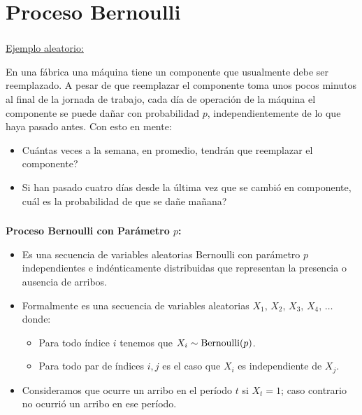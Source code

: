 \documentclass[ 10pt, xcolor = dvipsnames]{beamer}
\begin{document}
\section{Proceso Bernoulli}

\begin{frame}[allowframebreaks]
\frametitle{\insertsection}

\underline{Ejemplo aleatorio:}

En una f\'abrica una m\'aquina tiene un componente que usualmente debe ser reemplazado. A pesar de que reemplazar el componente toma unos pocos minutos al final de la jornada de trabajo, cada d\'ia de operaci\'on de la m\'aquina el componente se puede da\~nar con probabilidad $p$, independientemente de lo que haya pasado antes. Con esto en mente: 
\begin{itemize}
\item Cu\'antas veces a la semana, en promedio, tendr\'an que reemplazar el componente? 
\item Si han pasado cuatro d\'ias desde la \'ultima vez que se cambi\'o en componente, cu\'al es la probabilidad de que se da\~ne ma\~nana? 
\end{itemize}

\end{frame}

\begin{frame}[allowframebreaks]
\frametitle{\insertsection}

\textbf{Proceso Bernoulli con Par\'ametro $p$:}
\begin{itemize}
\item Es una secuencia de variables aleatorias Bernoulli con par\'ametro $p$ independientes e ind\'enticamente distribuidas que representan la \linebreak presencia o ausencia de arribos. 
\item Formalmente es una secuencia de variables aleatorias $X_1, \, X_2, \, X_3, \, X_4, \, \dots$ donde: 
\begin{itemize}
\item Para todo \'indice $i$ tenemos que $X_i \sim \text{Bernoulli}(p)$. 
\item Para todo par de \'indices $i,j$ es el caso que $X_i$ es independiente de $X_j$. 
\end{itemize}
\item Consideramos que ocurre un arribo en el per\'iodo $t$ si $X_t = 1$; caso contrario no ocurri\'o un arribo en ese per\'iodo. 
\end{itemize}

\end{frame}
\end{document}

